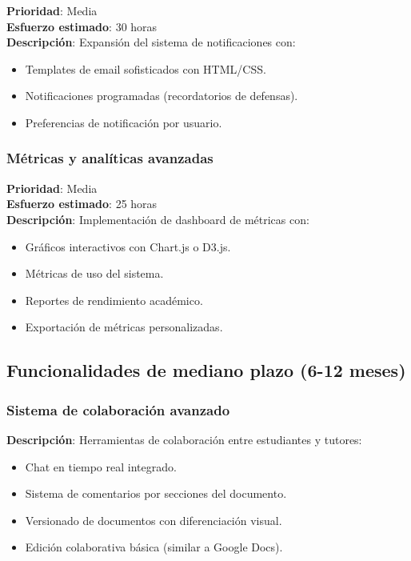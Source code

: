 \documentclass[12pt,a4paper,oneside]{report}
\providecommand{\tightlist}{%
  \setlength{\itemsep}{0pt}\setlength{\parskip}{0pt}}
\begin{document}
\textbf{Prioridad}: Media\\
\textbf{Esfuerzo estimado}: 30 horas\\
\textbf{Descripción}: Expansión del sistema de notificaciones con:

\begin{itemize}
\tightlist
\item
  Templates de email sofisticados con HTML/CSS.
\item
  Notificaciones programadas (recordatorios de defensas).
\item
  Preferencias de notificación por usuario.
\end{itemize}

\subsubsection{Métricas y analíticas
avanzadas}\label{muxe9tricas-y-analytics-avanzadas}

\textbf{Prioridad}: Media\\
\textbf{Esfuerzo estimado}: 25 horas\\
\textbf{Descripción}: Implementación de dashboard de métricas con:

\begin{itemize}
\tightlist
\item
  Gráficos interactivos con Chart.js o D3.js.
\item
  Métricas de uso del sistema.
\item
  Reportes de rendimiento académico.
\item
  Exportación de métricas personalizadas.
\end{itemize}

\subsection{Funcionalidades de mediano plazo (6-12
meses)}\label{funcionalidades-de-mediano-plazo-6-12-meses}

\subsubsection{Sistema de colaboración
avanzado}\label{sistema-de-colaboraciuxf3n-avanzado}

\textbf{Descripción}: Herramientas de colaboración entre estudiantes y
tutores:

\begin{itemize}
\tightlist
\item
  Chat en tiempo real integrado.
\item
  Sistema de comentarios por secciones del documento.
\item
  Versionado de documentos con diferenciación visual.
\item
  Edición colaborativa básica (similar a Google Docs).
\end{itemize}
\end{document}
